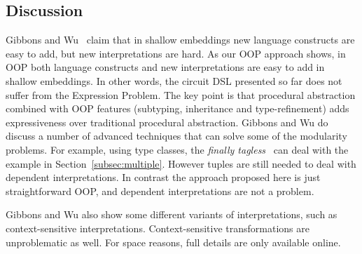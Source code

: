\subsection{Discussion} 
Gibbons and Wu~\cite{gibbons2014folding} claim that in shallow
embeddings new language constructs are easy to add, but new
interpretations are hard. As our OOP approach shows, in OOP both
language constructs and new interpretations are easy to add in shallow
embeddings. In other words, the circuit DSL presented so far does not
suffer from the Expression Problem. The key point is that procedural
abstraction combined with OOP features (subtyping, inheritance and
type-refinement) adds expressiveness over traditional procedural
abstraction. Gibbons and Wu do discuss a number of advanced techniques that 
can solve some of the modularity problems. For example, using type
classes, the \emph{finally
  tagless}~\cite{carette2009finally} can deal with the example in
Section~\ref{subsec:multiple}. However
tuples are still needed 
to deal with dependent interpretations. In contrast the approach
proposed here is just straightforward OOP, and dependent
interpretations are not a problem.
\begin{comment}
and \emph{data types a la
  carte}~\cite{swierstra2008data} (DTC).
Finally tagless approach uses a type class to abstract over all interpretations
of the language. Concrete interpretations are given through creating a data type and
making it an instance of that type. However, it forces dependent interpretations to be defined along with what they depend on.
DTC represents language constructs separately and composes them together using
extensible sums. However, not like OO languages which come with subtyping, one
has to manually implement the subtyping machinery for variants.
\end{comment}
Gibbons and Wu also show some different variants of interpretations,
such as context-sensitive interpretations. 
Context-sensitive transformations are unproblematic as well. 
For space reasons, full details are only available online.

\begin{comment}
Unlike \lstinline{width} and \lstinline{wellSized} which can be defined with
only the given circuit, context-dependent interpretations may need some context.
These contexts can be captured by arguments of the method. For example, a
function that collects all the connections between wires inside a circuit would have
the following signature:
\begin{lstlisting}
type Layout = List[List[Tuple2[Int,Int]]]
def tlayout(f: Int => Int): Layout
\end{lstlisting}
where the context \lstinline{f} may vary in recursive
calls. Context-sensitive transformations do not pose any particular
challenge. For space reasons, we omit the implementation details here. Full details
are available online.
\end{comment}